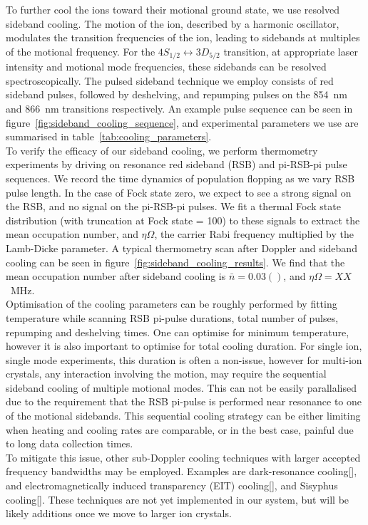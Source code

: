 \documentclass[12pt]{report}
\begin{document}
    To further cool the ions toward their motional ground state, we use resolved
    sideband cooling. The motion of the ion, described by a harmonic oscillator,
    modulates the transition frequencies of the ion, leading to sidebands at
    multiples of the motional frequency. For the $4S_{1/2} \leftrightarrow
    3D_{5/2}$ transition, at appropriate laser intensity and motional mode
    frequencies, these sidebands can be resolved spectroscopically. The pulsed
    sideband technique we employ consists of red sideband pulses, followed by
    deshelving, and repumping pulses on the 854~nm and 866~nm transitions
    respectively. An example pulse sequence can be seen in
    figure~\ref{fig:sideband_cooling_sequence}, and experimental parameters we use are summarised in table~\ref{tab:cooling_parameters}.\\
    To verify the efficacy of our sideband cooling, we perform thermometry
    experiments by driving on resonance red sideband (RSB) and pi-RSB-pi pulse
    sequences. We record the time dynamics of population flopping as we vary RSB
    pulse length. In the case of Fock state zero, we expect to see a strong
    signal on the RSB, and no signal on the pi-RSB-pi pulses. We fit a thermal
    Fock state distribution (with truncation at Fock state = 100) to these
    signals to extract the mean occupation number, and $\eta\Omega$, the carrier
    Rabi frequency multiplied by the Lamb-Dicke parameter. A typical thermometry
    scan after Doppler and sideband cooling can be seen in
    figure~\ref{fig:sideband_cooling_results}. We find that the mean occupation
    number after sideband cooling is $\bar{n} = 0.03()$, and $\eta\Omega =
    XX$~MHz.\\
    Optimisation of the cooling parameters can be roughly performed by fitting
    temperature while scanning RSB pi-pulse durations, total number of pulses,
    repumping and deshelving times. One can optimise for minimum temperature,
    however it is also important to optimise for total cooling duration. For
    single ion, single mode experiments, this duration is often a non-issue,
    however for multi-ion crystals, any interaction involving the motion, may
    require the sequential sideband cooling of multiple motional modes. This can
    not be easily parallalised due to the requirement that the RSB pi-pulse is
    performed near resonance to one of the motional sidebands. This sequential
    cooling strategy can be either limiting when heating and cooling rates are
    comparable, or in the best case, painful due to long data collection times.\\
    To mitigate this issue, other sub-Doppler cooling techniques with larger
    accepted frequency bandwidths may be employed. Examples are dark-resonance
    cooling[], and electromagnetically induced transparency (EIT) cooling[], and
    Sisyphus cooling[]. These techniques are not yet implemented in our system,
    but will be likely additions once we move to larger ion crystals.\\
\end{document}
